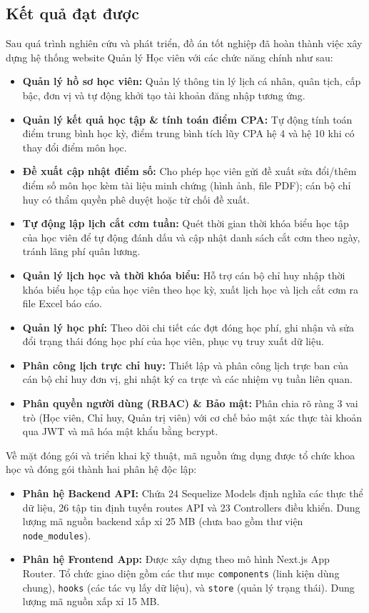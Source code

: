 \documentclass[../DoAn.tex]{subfiles}
\begin{document}
\subsection{Kết quả đạt được}
Sau quá trình nghiên cứu và phát triển, đồ án tốt nghiệp đã hoàn thành việc xây dựng hệ thống website Quản lý Học viên với các chức năng chính như sau:
\begin{itemize}
    \item \textbf{Quản lý hồ sơ học viên:} Quản lý thông tin lý lịch cá nhân, quân tịch, cấp bậc, đơn vị và tự động khởi tạo tài khoản đăng nhập tương ứng.
    \item \textbf{Quản lý kết quả học tập \& tính toán điểm CPA:} Tự động tính toán điểm trung bình học kỳ, điểm trung bình tích lũy CPA hệ 4 và hệ 10 khi có thay đổi điểm môn học.
    \item \textbf{Đề xuất cập nhật điểm số:} Cho phép học viên gửi đề xuất sửa đổi/thêm điểm số môn học kèm tài liệu minh chứng (hình ảnh, file PDF); cán bộ chỉ huy có thẩm quyền phê duyệt hoặc từ chối đề xuất.
    \item \textbf{Tự động lập lịch cắt cơm tuần:} Quét thời gian thời khóa biểu học tập của học viên để tự động đánh dấu và cập nhật danh sách cắt cơm theo ngày, tránh lãng phí quân lương.
    \item \textbf{Quản lý lịch học và thời khóa biểu:} Hỗ trợ cán bộ chỉ huy nhập thời khóa biểu học tập của học viên theo học kỳ, xuất lịch học và lịch cắt cơm ra file Excel báo cáo.
    \item \textbf{Quản lý học phí:} Theo dõi chi tiết các đợt đóng học phí, ghi nhận và sửa đổi trạng thái đóng học phí của học viên, phục vụ truy xuất dữ liệu.
    \item \textbf{Phân công lịch trực chỉ huy:} Thiết lập và phân công lịch trực ban của cán bộ chỉ huy đơn vị, ghi nhật ký ca trực và các nhiệm vụ tuần liên quan.
    \item \textbf{Phân quyền người dùng (RBAC) \& Bảo mật:} Phân chia rõ ràng 3 vai trò (Học viên, Chỉ huy, Quản trị viên) với cơ chế bảo mật xác thực tài khoản qua JWT và mã hóa mật khẩu bằng bcrypt.
\end{itemize}

Về mặt đóng gói và triển khai kỹ thuật, mã nguồn ứng dụng được tổ chức khoa học và đóng gói thành hai phân hệ độc lập:
\begin{itemize}
    \item \textbf{Phân hệ Backend API:} Chứa 24 Sequelize Models định nghĩa các thực thể dữ liệu, 26 tập tin định tuyến routes API và 23 Controllers điều khiển. Dung lượng mã nguồn backend xấp xỉ 25 MB (chưa bao gồm thư viện \texttt{node\_modules}).
    \item \textbf{Phân hệ Frontend App:} Được xây dựng theo mô hình Next.js App Router. Tổ chức giao diện gồm các thư mục \texttt{components} (linh kiện dùng chung), \texttt{hooks} (các tác vụ lấy dữ liệu), và \texttt{store} (quản lý trạng thái). Dung lượng mã nguồn xấp xỉ 15 MB.
\end{itemize}
\end{document}
